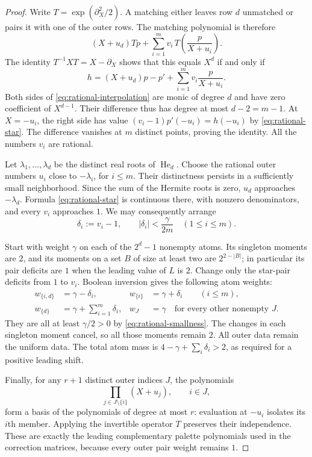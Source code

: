 \documentclass[11pt,a4paper]{article}
\theoremstyle{definition}
\begin{document}
\begin{proof}
Write $T=\exp(\partial_X^2/2)$. A matching either leaves row $d$ unmatched
or pairs it with one of the outer rows. The matching polynomial is therefore
\[
 (X+u_d)Tp+\sum_{i=1}^m v_i\,T\!\left(\frac{p}{X+u_i}\right).
\]
The identity $T^{-1}XT=X-\partial_X$ shows that this equals $X^d$ if and
only if
\begin{equation}\label{eq:rational-interpolation}
 h=(X+u_d)p-p'+\sum_{i=1}^m v_i\frac{p}{X+u_i}.
\end{equation}
Both sides of \eqref{eq:rational-interpolation} are monic of degree $d$
and have zero coefficient of $X^{d-1}$. Their difference thus has degree
at most $d-2=m-1$. At $X=-u_i$, the right side has value
$(v_i-1)p'(-u_i)=h(-u_i)$ by \eqref{eq:rational-star}.
The difference vanishes at $m$ distinct points, proving the identity.
All the numbers $v_i$ are rational.

Let $\lambda_1,\ldots,\lambda_d$ be the distinct real roots of
$\operatorname{He}_d$. Choose the rational outer numbers $u_i$ close to
$-\lambda_i$, for $i\le m$. Their distinctness persists in a sufficiently
small neighborhood. Since the sum of the Hermite roots is zero,
$u_d$ approaches $-\lambda_d$. Formula \eqref{eq:rational-star} is
continuous there, with nonzero denominators, and every $v_i$ approaches
$1$. We may consequently arrange
\begin{equation}\label{eq:rational-smallness}
 \delta_i:=v_i-1,\qquad
 |\delta_i|<\frac{\gamma}{2m}\quad(1\le i\le m).
\end{equation}

Start with weight $\gamma$ on each of the $2^d-1$ nonempty atoms.
Its singleton moments are $2$, and its moments on a set $B$ of size
at least two are $2^{2-|B|}$; in particular its pair deficits are $1$
when the leading value of $L$ is $2$. Change only the star-pair deficits
from $1$ to $v_i$. Boolean inversion gives the following atom weights:
\[
 \begin{aligned}
 w_{\{i,d\}}&=\gamma-\delta_i,&
 w_{\{i\}}&=\gamma+\delta_i\qquad(i\le m),\\
 w_{\{d\}}&=\gamma+\sum_{i=1}^m\delta_i,&
 w_J&=\gamma\quad\text{for every other nonempty }J.
 \end{aligned}
\]
They are all at least $\gamma/2>0$ by
\eqref{eq:rational-smallness}. The changes in each singleton moment
cancel, so all those moments remain $2$. All outer data remain the
uniform data. The total atom mass is
$4-\gamma+\sum_i\delta_i>2$, as required for a positive leading shift.

Finally, for any $r+1$ distinct outer indices $J$, the polynomials
\[
 \prod_{j\in J\setminus\{i\}}(X+u_j),\qquad i\in J,
\]
form a basis of the polynomials of degree at most $r$: evaluation at
$-u_i$ isolates its $i$th member. Applying the invertible operator $T$
preserves their independence. These are exactly the leading complementary
palette polynomials used in the correction matrices, because every
outer pair weight remains $1$.
\end{proof}
\end{document}
